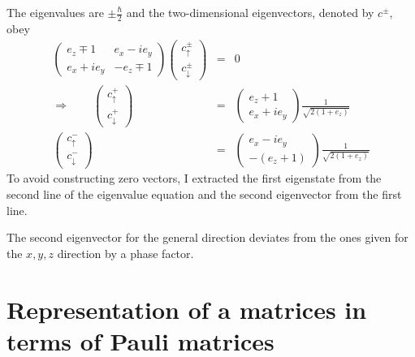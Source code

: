 \documentclass[11pt,a4paper]{report}
\begin{document}
The eigenvalues are $\pm\frac{\hbar}{2}$ and the two-dimensional
eigenvectors, denoted by $c^{\pm}$, obey
\begin{eqnarray}
\left(\begin{array}{cc}e_z\mp1 &e_x-ie_y\\e_x+ie_y&-e_z\mp1\end{array}\right)
\left(\begin{array}{c}c^\pm_\uparrow\\c^\pm_\downarrow\end{array}\right)&=&0
\nonumber\\
\Rightarrow\qquad
\left(\begin{array}{c}c^+_\uparrow\\c^+_\downarrow\end{array}\right)
&=&\left(\begin{array}{c}e_z+1\\e_x+ie_y\end{array}\right)
\frac{1}{\sqrt{2(1+e_z)}}
\nonumber\\
\left(\begin{array}{c}c^-_\uparrow\\c^-_\downarrow\end{array}\right)
&=&\left(\begin{array}{c}e_x-ie_y\\ -(e_z+1)\end{array}\right)
\frac{1}{\sqrt{2(1+e_z)}}
\end{eqnarray}
To avoid constructing zero vectors, I extracted the first eigenstate
from the second line of the eigenvalue equation and the second
eigenvector from the first line.

The second eigenvector for the general direction deviates from the
ones given for the $x,y,z$ direction by a phase factor.


\section{Representation of a matrices in terms of Pauli matrices}
\end{document}
